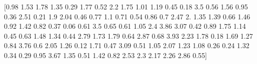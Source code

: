 \documentclass[preview]{standalone}
\begin{document}
\begin{center}
[0.98 1.53 1.78 1.35 0.29 1.77 0.52 2.2  1.75 1.01 1.19 0.45 0.18 3.5
 0.56 1.56 0.95 0.36 2.51 0.21 1.9  2.04 0.46 0.77 1.1  0.71 0.54 0.86
 0.7  2.47 2.   1.35 1.39 0.66 1.46 0.92 1.42 0.82 0.37 0.06 0.61 3.5
 0.65 0.61 1.05 2.4  3.86 3.07 0.42 0.89 1.75 1.14 0.45 0.63 1.48 1.34
 0.44 2.79 1.73 1.79 0.64 2.87 0.68 3.93 2.23 1.78 0.18 1.69 1.27 0.84
 3.76 0.6  2.05 1.26 0.12 1.71 0.47 3.09 0.51 1.05 2.07 1.23 1.08 0.26
 0.24 1.32 0.34 0.29 0.95 3.67 1.35 0.51 1.42 0.82 2.53 2.3  2.17 2.26
 2.86 0.55]
\end{center}
\end{document}
